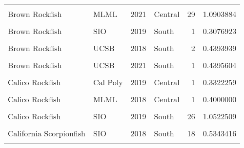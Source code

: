\documentclass[
]{article}
\begin{document}
\begin{longtable}[t]{llrlrr}
\cellcolor{gray!6}{Brown Rockfish} & \cellcolor{gray!6}{MLML} & \cellcolor{gray!6}{2019} & \cellcolor{gray!6}{Central} & \cellcolor{gray!6}{19} & \cellcolor{gray!6}{1.0373537}\\
Brown Rockfish & MLML & 2021 & Central & 29 & 1.0903884\\
\cellcolor{gray!6}{Brown Rockfish} & \cellcolor{gray!6}{SIO} & \cellcolor{gray!6}{2018} & \cellcolor{gray!6}{South} & \cellcolor{gray!6}{1} & \cellcolor{gray!6}{0.3333333}\\
Brown Rockfish & SIO & 2019 & South & 1 & 0.3076923\\
\addlinespace
\cellcolor{gray!6}{Brown Rockfish} & \cellcolor{gray!6}{SIO} & \cellcolor{gray!6}{2021} & \cellcolor{gray!6}{South} & \cellcolor{gray!6}{3} & \cellcolor{gray!6}{0.6349206}\\
Brown Rockfish & UCSB & 2018 & South & 2 & 0.4393939\\
\cellcolor{gray!6}{Brown Rockfish} & \cellcolor{gray!6}{UCSB} & \cellcolor{gray!6}{2019} & \cellcolor{gray!6}{South} & \cellcolor{gray!6}{13} & \cellcolor{gray!6}{1.4358974}\\
Brown Rockfish & UCSB & 2021 & South & 1 & 0.4395604\\
\cellcolor{gray!6}{Calico Rockfish} & \cellcolor{gray!6}{Cal Poly} & \cellcolor{gray!6}{2018} & \cellcolor{gray!6}{Central} & \cellcolor{gray!6}{3} & \cellcolor{gray!6}{0.3283875}\\
\addlinespace
Calico Rockfish & Cal Poly & 2019 & Central & 1 & 0.3322259\\
\cellcolor{gray!6}{Calico Rockfish} & \cellcolor{gray!6}{Cal Poly} & \cellcolor{gray!6}{2021} & \cellcolor{gray!6}{Central} & \cellcolor{gray!6}{7} & \cellcolor{gray!6}{0.6702619}\\
Calico Rockfish & MLML & 2018 & Central & 1 & 0.4000000\\
\cellcolor{gray!6}{Calico Rockfish} & \cellcolor{gray!6}{SIO} & \cellcolor{gray!6}{2018} & \cellcolor{gray!6}{South} & \cellcolor{gray!6}{8} & \cellcolor{gray!6}{0.8864469}\\
Calico Rockfish & SIO & 2019 & South & 26 & 1.0522509\\
\addlinespace
\cellcolor{gray!6}{Calico Rockfish} & \cellcolor{gray!6}{SIO} & \cellcolor{gray!6}{2021} & \cellcolor{gray!6}{South} & \cellcolor{gray!6}{12} & \cellcolor{gray!6}{0.8075758}\\
California Scorpionfish & SIO & 2018 & South & 18 & 0.5343416\\
\cellcolor{gray!6}{California Scorpionfish} & \cellcolor{gray!6}{SIO} & \cellcolor{gray!6}{2019} & \cellcolor{gray!6}{South} & \cellcolor{gray!6}{20} & \cellcolor{gray!6}{0.3966239}\\

\end{longtable}
\end{document}
